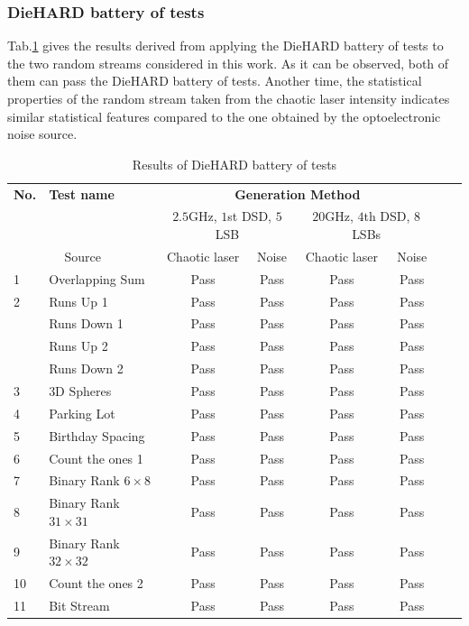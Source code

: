 \subsubsection{DieHARD battery of tests}


Tab.\ref{diehard} gives the results derived from applying the
DieHARD battery of tests to the two random streams considered in this
work.  As it can be observed, both of them can pass the DieHARD
battery of tests. Another time, the statistical properties of the
random stream taken from the chaotic laser intensity indicates similar
statistical features compared to the one obtained by the
optoelectronic noise source.
  \begin{table}[!t]
    \renewcommand{\arraystretch}{1.3}
    \caption{Results of DieHARD battery of tests}
    \label{diehard}
    \centering
    \begin{tabular}{llcccccc} \toprule
      \textbf{No.} &\textbf{Test name} &\multicolumn{4}{c}{\textbf{Generation Method}} \\ \cmidrule(r){3-6}
      & & \multicolumn{2}{c}{$2.5$GHz, $1$st DSD, $5$ LSB} &  \multicolumn{2}{c}{$20$GHz, $4$th DSD, $8$ LSBs} \\ 
      \multicolumn{2}{c}{Source} & Chaotic laser& Noise & Chaotic laser & Noise\\ \hline
      1 & Overlapping Sum &Pass &Pass&Pass &Pass\\
      2 & Runs Up 1 &Pass & Pass&Pass &Pass\\
      &Runs Down 1 &Pass &Pass&Pass &Pass\\
      &Runs Up 2 &Pass &Pass &Pass &Pass\\
      &Runs Down 2 &Pass & Pass&Pass &Pass \\
      3 & 3D Spheres &Pass &Pass &Pass &Pass\\
      4 & Parking Lot &Pass &Pass&Pass &Pass\\
      5 & Birthday Spacing &Pass &Pass&Pass &Pass\\
      6 & Count the ones 1 &Pass &Pass&Pass &Pass\\
      7 &Binary Rank $6 \times 8$ &Pass & Pass&Pass &Pass\\
      8 &Binary Rank $31 \times 31$ &Pass &Pass&Pass &Pass \\
      9 &Binary Rank $32 \times 32$ &Pass &Pass&Pass &Pass \\
      10 &Count the ones 2 &Pass &Pass &Pass &Pass\\
      11 &Bit Stream &Pass &Pass &Pass &Pass\\

\end{tabular}
\end{table}
